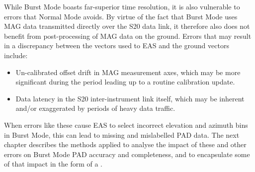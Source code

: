 While Burst Mode boasts far-superior time resolution, it is also vulnerable to errors that Normal Mode avoids. By virtue of the fact that Burst Mode uses MAG data transmitted directly over the S20 data link, it therefore also does not benefit from post-processing of MAG data on the ground. Errors that may result in a discrepancy between the vectors used to  EAS and the  ground vectors include: 
\begin{itemize}
    \item Un-calibrated offset drift in MAG measurement axes, which may be more significant during the period leading up to a routine calibration update\cite{owen2021}\cite{horbury2020}.
    \item Data latency in the S20 inter-instrument link itself, which may be inherent and/or exaggerated  by periods of heavy data traffic\cite{owen2021}.
\end{itemize}

When errors like these cause EAS to select incorrect elevation and azimuth bins in Burst Mode, this can lead to missing and mislabelled PAD data. The next chapter describes the methods applied to analyse the impact of these and other errors on Burst Mode PAD accuracy and completeness, and to encapsulate some of that impact in the form of a .

